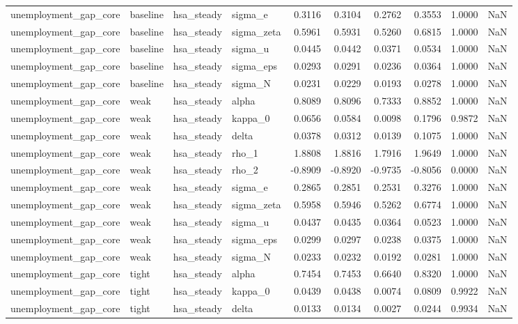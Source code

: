 \begin{tabular}{llllrrrrrl}
unemployment\_gap\_core & baseline & hsa\_steady & sigma\_e & 0.3116 & 0.3104 & 0.2762 & 0.3553 & 1.0000 & NaN \\
unemployment\_gap\_core & baseline & hsa\_steady & sigma\_zeta & 0.5961 & 0.5931 & 0.5260 & 0.6815 & 1.0000 & NaN \\
unemployment\_gap\_core & baseline & hsa\_steady & sigma\_u & 0.0445 & 0.0442 & 0.0371 & 0.0534 & 1.0000 & NaN \\
unemployment\_gap\_core & baseline & hsa\_steady & sigma\_eps & 0.0293 & 0.0291 & 0.0236 & 0.0364 & 1.0000 & NaN \\
unemployment\_gap\_core & baseline & hsa\_steady & sigma\_N & 0.0231 & 0.0229 & 0.0193 & 0.0278 & 1.0000 & NaN \\
unemployment\_gap\_core & weak & hsa\_steady & alpha & 0.8089 & 0.8096 & 0.7333 & 0.8852 & 1.0000 & NaN \\
unemployment\_gap\_core & weak & hsa\_steady & kappa\_0 & 0.0656 & 0.0584 & 0.0098 & 0.1796 & 0.9872 & NaN \\
unemployment\_gap\_core & weak & hsa\_steady & delta & 0.0378 & 0.0312 & 0.0139 & 0.1075 & 1.0000 & NaN \\
unemployment\_gap\_core & weak & hsa\_steady & rho\_1 & 1.8808 & 1.8816 & 1.7916 & 1.9649 & 1.0000 & NaN \\
unemployment\_gap\_core & weak & hsa\_steady & rho\_2 & -0.8909 & -0.8920 & -0.9735 & -0.8056 & 0.0000 & NaN \\
unemployment\_gap\_core & weak & hsa\_steady & sigma\_e & 0.2865 & 0.2851 & 0.2531 & 0.3276 & 1.0000 & NaN \\
unemployment\_gap\_core & weak & hsa\_steady & sigma\_zeta & 0.5958 & 0.5946 & 0.5262 & 0.6774 & 1.0000 & NaN \\
unemployment\_gap\_core & weak & hsa\_steady & sigma\_u & 0.0437 & 0.0435 & 0.0364 & 0.0523 & 1.0000 & NaN \\
unemployment\_gap\_core & weak & hsa\_steady & sigma\_eps & 0.0299 & 0.0297 & 0.0238 & 0.0375 & 1.0000 & NaN \\
unemployment\_gap\_core & weak & hsa\_steady & sigma\_N & 0.0233 & 0.0232 & 0.0192 & 0.0281 & 1.0000 & NaN \\
unemployment\_gap\_core & tight & hsa\_steady & alpha & 0.7454 & 0.7453 & 0.6640 & 0.8320 & 1.0000 & NaN \\
unemployment\_gap\_core & tight & hsa\_steady & kappa\_0 & 0.0439 & 0.0438 & 0.0074 & 0.0809 & 0.9922 & NaN \\
unemployment\_gap\_core & tight & hsa\_steady & delta & 0.0133 & 0.0134 & 0.0027 & 0.0244 & 0.9934 & NaN \\

\end{tabular}
